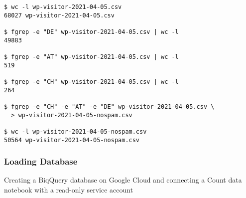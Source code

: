 \begin{lstlisting}[caption=Removing Spam, frame=single, basicstyle=\ttfamily]
$ wc -l wp-visitor-2021-04-05.csv
68027 wp-visitor-2021-04-05.csv

$ fgrep -e "DE" wp-visitor-2021-04-05.csv | wc -l
49883

$ fgrep -e "AT" wp-visitor-2021-04-05.csv | wc -l
519

$ fgrep -e "CH" wp-visitor-2021-04-05.csv | wc -l
264

$ fgrep -e "CH" -e "AT" -e "DE" wp-visitor-2021-04-05.csv \
  > wp-visitor-2021-04-05-nospam.csv

$ wc -l wp-visitor-2021-04-05-nospam.csv 
50564 wp-visitor-2021-04-05-nospam.csv

\end{lstlisting}

\subsubsection{Loading Database}

Creating a BiqQuery database on Google Cloud and connecting a Count data notebook with a read-only service account
